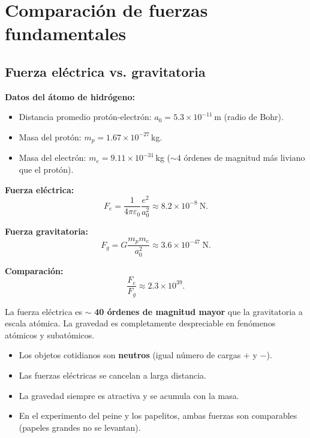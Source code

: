 \documentclass[12pt,a4paper]{article}
\begin{document}
\section{Comparación de fuerzas fundamentales}

\subsection{Fuerza eléctrica vs. gravitatoria}

\textbf{Datos del átomo de hidrógeno:}
\begin{itemize}[nosep]
  \item Distancia promedio protón-electrón:
        $a_0 = 5.3 \times 10^{-11}$\,m (radio de Bohr).
  \item Masa del protón: $m_p = 1.67 \times 10^{-27}$\,kg.
  \item Masa del electrón: $m_e = 9.11 \times 10^{-31}$\,kg
        ($\sim 4$ órdenes de magnitud más liviano que el protón).
\end{itemize}

\textbf{Fuerza eléctrica:}
\[
F_e = \frac{1}{4\pi\varepsilon_0} \frac{e^{2}}{a_0^{2}}
     \approx 8.2 \times 10^{-8}\ \text{N}.
\]

\textbf{Fuerza gravitatoria:}
\[
F_g = G \frac{m_p m_e}{a_0^{2}}
     \approx 3.6 \times 10^{-47}\ \text{N}.
\]

\textbf{Comparación:}
\[
\frac{F_e}{F_g} \approx 2.3 \times 10^{39}.
\]

La fuerza eléctrica es $\sim$ \textbf{40 órdenes de magnitud mayor} que
la gravitatoria a escala atómica. La gravedad es completamente
despreciable en fenómenos atómicos y subatómicos.

\begin{warnbox}
  \begin{itemize}[nosep]
    \item Los objetos cotidianos son \textbf{neutros} (igual número de
          cargas $+$ y $-$).
    \item Las fuerzas eléctricas se cancelan a larga distancia.
    \item La gravedad siempre es atractiva y se acumula con la masa.
    \item En el experimento del peine y los papelitos, ambas fuerzas
          son comparables (papeles grandes no se levantan).
  \end{itemize}
\end{warnbox}
\end{document}
